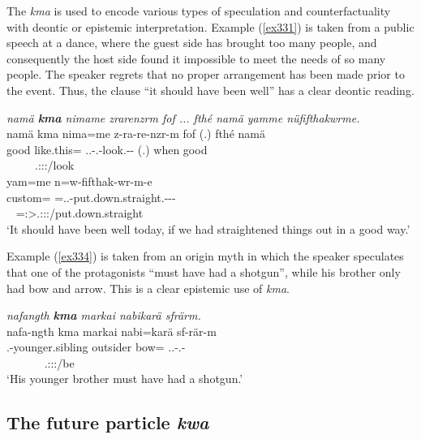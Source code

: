 The   \emph{kma} is used to encode various types of speculation and counterfactuality with deontic or epistemic interpretation. Example (\ref{ex331}) is taken from a public speech at a dance, where the guest side has brought too many people, and consequently the host side found it impossible to meet the needs of so many people. The speaker regrets that no proper arrangement has been made prior to the event. Thus, the clause ``it should have been well'' has a clear deontic reading.

\begin{exe}
 	\ex \emph{namä \textbf{kma} nimame zrarenzrm fof ... fthé namä yamme nüfifthakwrme.}\\
 	\glll namä kma nima=me z-ra-re-nzr-m fof (.) fthé namä\\
 	good {\Pot} like.this={\Ins} \Tsg.\F.\Bet-\Irr.\Vc-look.\Ext-\Ndu-\Dur{} {\Emph} (.) when good\\
	~ ~ ~ {\footnotesize \Tsg.\F:\Sbj:\Irr:\Ipfv/look} ~ ~ ~ ~\\
	\sn
	\glll yam=me n=w-fifthak-wr-m-e\\
	custom={\Ins} \Immpst=\Tsg.\F.\Alph-put.down.straight.\Ext-\Ndu-\Dur-{\Fnsg}\\
	~ {\footnotesize \Immpst=\Fpl:\Sbj>\Tsg.\F:\Obj:\Nonpast:\Dur/put.down.straight}\\
	\trans `It should have been well today, if we had straightened things out in a good way.' 
	\label{ex331}
\end{exe}

Example (\ref{ex334}) is taken from an origin myth in which the speaker speculates that one of the protagonists ``must have had a shotgun'', while his brother only had bow and arrow. This is a clear epistemic use of \emph{kma}.

\begin{exe}
	\ex \emph{nafangth \textbf{kma} markai nabikarä sfrärm.}\\
	\glll nafa-ngth kma markai nabi=karä sf-rär-m\\
	\Third.{\Poss}-younger.sibling {\Pot} outsider bow={\Prop} \Tsg.\Masc.\Betatwo-\Cop.\Ndu-\Dur\\
	~ ~ ~ ~ {\footnotesize \Tsg.\Masc:\Sbj:\Pst:\Dur/be}\\
	\trans `His younger brother must have had a shotgun.' 
	\label{ex334}
\end{exe}

\subsection{The future particle \emph{kwa}}\label{futurekwa}

